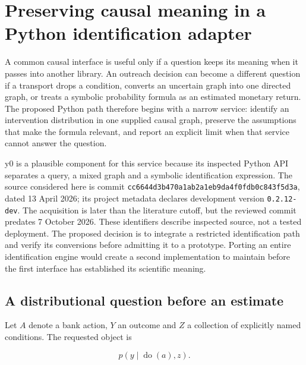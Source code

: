 \hypertarget{preserving-causal-meaning-in-a-python-identification-adapter}{%
\section{Preserving causal meaning in a Python identification
adapter}\label{preserving-causal-meaning-in-a-python-identification-adapter}}

\label{exec13:python-identification}

A common causal interface is useful only if a question keeps its meaning
when it passes into another library. An outreach decision can become a
different question if a transport drops a condition, converts an
uncertain graph into one directed graph, or treats a symbolic
probability formula as an estimated monetary return. The proposed Python
path therefore begins with a narrow service: identify an intervention
distribution in one supplied causal graph, preserve the assumptions that
make the formula relevant, and report an explicit limit when that
service cannot answer the question.

y0 is a plausible component for this service because its inspected
Python API separates a query, a mixed graph and a symbolic
identification expression. The source considered here is commit
\texttt{cc6644d3b470a1ab2a1eb9da4f0fdb0c843f5d3a}, dated 13 April 2026;
its project metadata declares development version \texttt{0.2.12-dev}.
The acquisition is later than the literature cutoff, but the reviewed
commit predates 7 October 2026. These identifiers describe inspected
source, not a tested deployment. The proposed decision is to integrate a
restricted identification path and verify its conversions before
admitting it to a prototype. Porting an entire identification engine
would create a second implementation to maintain before the first
interface has established its scientific meaning.
\citep{exec13_y0_api,exec13_y0_metadata}

\hypertarget{a-distributional-question-before-an-estimate}{%
\subsection{A distributional question before an
estimate}\label{a-distributional-question-before-an-estimate}}

Let \(A\) denote a bank action, \(Y\) an outcome and \(Z\) a collection
of explicitly named conditions. The requested object is

\[
 p(y\mid\operatorname{do}(a),z).
\]

